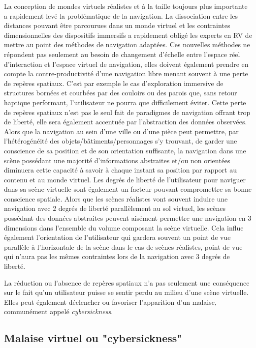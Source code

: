 La conception de mondes virtuels réalistes et à la taille toujours plus importante a rapidement levé la problématique de la navigation. La dissociation entre les distances pouvant être parcourues dans un monde virtuel et les contraintes dimensionnelles des dispositifs immersifs a rapidement obligé les experts en RV de mettre au point des méthodes de navigation adaptées. Ces nouvelles méthodes ne répondent pas seulement au besoin de changement d'échelle entre l'espace réel d'interaction et l'espace virtuel de navigation, elles doivent également prendre en compte la contre-productivité d'une navigation libre menant souvent à une perte de repères spatiaux. C'est par exemple le cas d'exploration immersive de structures bornées et courbées par des couloirs ou des parois que, sans retour haptique performant, l'utilisateur ne pourra que difficilement éviter. Cette perte de repères spatiaux n'est pas le seul fait de paradigmes de navigation offrant trop de liberté, elle sera également accentuée par l'abstraction des données observées. Alors que la navigation au sein d'une ville ou d'une pièce peut permettre, par l'hétérogénéité des objets/bâtiments/personnages s'y trouvant, de garder une conscience de sa position et de son orientation suffisante, la navigation dans une scène possédant une majorité d'informations abstraites et/ou non orientées diminuera cette capacité à savoir à chaque instant sa position par rapport au contenu et au monde virtuel. Les degrés de liberté de l'utilisateur pour naviguer dans sa scène virtuelle sont également un facteur pouvant compromettre sa bonne conscience spatiale. Alors que les scènes réalistes vont souvent induire une navigation avec 2 degrés de liberté parallèlement au sol virtuel, les scènes possédant des données abstraites peuvent aisément permettre une navigation en 3 dimensions dans l'ensemble du volume composant la scène virtuelle. Cela influe également l'orientation de l'utilisateur qui gardera souvent un point de vue parallèle à l'horizontale de la scène dans le cas de scènes réalistes, point de vue qui n'aura pas les mêmes contraintes lors de la navigation avec 3 degrés de liberté.

La réduction ou l'absence de repères spatiaux n'a pas seulement une conséquence sur le fait qu'un utilisateur puisse se sentir perdu au milieu d'une scène virtuelle. Elles peut également déclencher ou favoriser l'apparition d'un malaise, communément appelé \textit{cybersickness}. 

\subsection{Malaise virtuel ou "cybersickness"}

